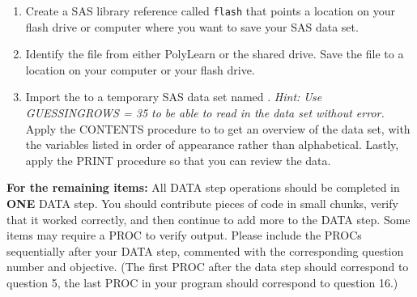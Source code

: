\begin{enumerate}
\item Create a SAS library reference called \texttt{flash} that points a location on your flash drive or computer where you want to save your SAS data set.
\item Identify the  file from either PolyLearn or the shared drive.  Save the file to a location on your computer or your flash drive.
\item Import the  to a temporary SAS data set named  .  \emph{Hint: Use GUESSINGROWS = 35 to be able to read in the data set without error.} Apply the CONTENTS procedure to  to get an overview of the data set, with the variables listed in order of appearance rather than alphabetical.  Lastly, apply the PRINT procedure so that you can review the data.
\end{enumerate}
\textbf{For the remaining items:}  All DATA step operations should be completed in \textbf{ONE} DATA step.  You should contribute pieces of code in small chunks, verify that it worked correctly, and then continue to add more to the DATA step.  Some items may require a PROC to verify output.  Please include the PROCs sequentially after your DATA step, commented with the corresponding question number and objective.  (The first PROC after the data step should correspond to question 5, the last PROC in your program should correspond to question 16.)
